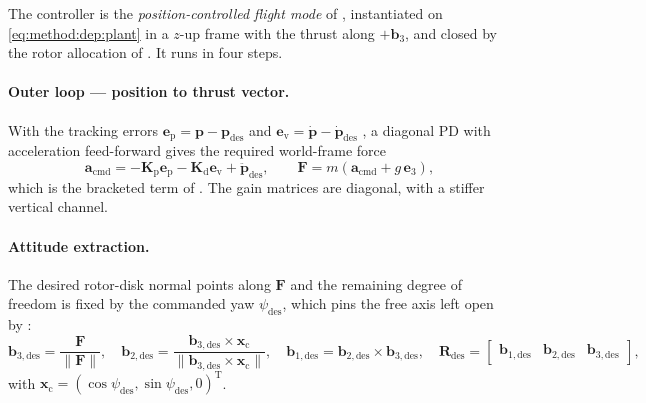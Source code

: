 \documentclass[headsepline,footsepline,footinclude=false,oneside,fontsize=11pt,paper=a4,listof=totoc,bibliography=totoc]{scrbook}
\theoremstyle{definition}
\theoremstyle{plain}
\theoremstyle{remark}
\newcommand{\vect}[1]{\boldsymbol{#1}}
\newcommand{\matr}[1]{\boldsymbol{#1}}
\newcommand{\trans}{^{\textrm{T}}}
\newcommand{\sidx}[1]{_{\textrm{#1}}}
\newcommand{\unitvec}[1]{\textbf{e}_{#1}}
\begin{document}
The controller is the \emph{position-controlled flight mode} of
\parencite[Eqs.~(19)--(23)]{lee2010geometric}, instantiated on \eqref{eq:method:dep:plant} in a
$z$-up frame with the thrust along $+\vect{b}_{3}$, and closed by the rotor allocation of
\parencite{mellinger2011minimum}. It runs in four steps.

\paragraph{Outer loop --- position to thrust vector.} With the tracking errors
$\vect{e}\sidx{p} = \vect{p}-\vect{p}\sidx{des}$ and
$\vect{e}\sidx{v} = \dot{\vect{p}}-\dot{\vect{p}}\sidx{des}$
\parencite[Eqs.~(17)--(18)]{lee2010geometric}, a diagonal PD with acceleration feed-forward gives
the required world-frame force
\begin{equation}\label{eq:method:dep:outer}
  \vect{a}\sidx{cmd} = -\matr{K}\sidx{p}\vect{e}\sidx{p} - \matr{K}\sidx{d}\vect{e}\sidx{v} + \ddot{\vect{p}}\sidx{des},
  \qquad
  \vect{F} = m\left(\vect{a}\sidx{cmd} + g\,\unitvec{3}\right),
\end{equation}
which is the bracketed term of \parencite[Eq.~(23)]{lee2010geometric}. The gain matrices are
diagonal, with a stiffer vertical channel.

\paragraph{Attitude extraction.} The desired rotor-disk normal points along $\vect{F}$ and the remaining degree of
freedom is fixed by the commanded yaw $\psi\sidx{des}$, which pins the free axis left open by
\parencite[Eqs.~(22)--(23)]{lee2010geometric}:
\begin{equation}\label{eq:method:dep:att}
  \vect{b}_{3,\mathrm{des}} = \frac{\vect{F}}{\|\vect{F}\|},\quad
  \vect{b}_{2,\mathrm{des}} = \frac{\vect{b}_{3,\mathrm{des}}\times\vect{x}\sidx{c}}{\|\vect{b}_{3,\mathrm{des}}\times\vect{x}\sidx{c}\|},\quad
  \vect{b}_{1,\mathrm{des}} = \vect{b}_{2,\mathrm{des}}\times\vect{b}_{3,\mathrm{des}},\quad
  \matr{R}\sidx{des} = \begin{bmatrix}\vect{b}_{1,\mathrm{des}} & \vect{b}_{2,\mathrm{des}} & \vect{b}_{3,\mathrm{des}}\end{bmatrix},
\end{equation}
with $\vect{x}\sidx{c} = (\cos\psi\sidx{des},\sin\psi\sidx{des},0)\trans$.
\end{document}
